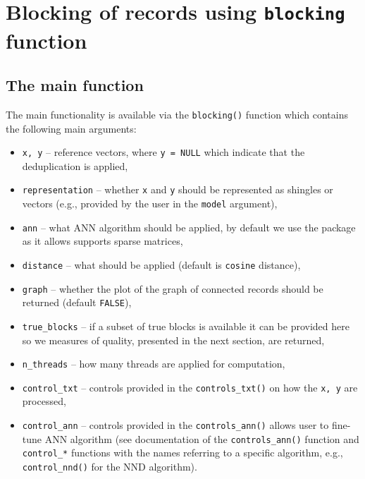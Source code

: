 \section{\texorpdfstring{Blocking of records using \texttt{blocking} function}{Blocking of records using blocking function}}\label{sec-blocks}

\subsection{The main function}\label{the-main-function}

The main functionality is available via the \texttt{blocking()} function which
contains the following main arguments:

\begin{itemize}
\tightlist
\item
  \texttt{x,\ y} -- reference vectors, where \texttt{y\ =\ NULL} which indicate that
  the deduplication is applied,
\item
  \texttt{representation} -- whether \texttt{x} and \texttt{y} should be represented as
  shingles or vectors (e.g., provided by the user in the \texttt{model}
  argument),
\item
  \texttt{ann} -- what ANN algorithm should be applied, by default we use the
   package as it allows supports sparse matrices,
\item
  \texttt{distance} -- what should be applied (default is \texttt{cosine} distance),
\item
  \texttt{graph} -- whether the plot of the graph of connected records should
  be returned (default \texttt{FALSE}),
\item
  \texttt{true\_blocks} -- if a subset of true blocks is available it can be
  provided here so we measures of quality, presented in the next
  section, are returned,
\item
  \texttt{n\_threads} -- how many threads are applied for computation,
\item
  \texttt{control\_txt} -- controls provided in the \texttt{controls\_txt()} on how
  the \texttt{x,\ y} are processed,
\item
  \texttt{control\_ann} -- controls provided in the \texttt{controls\_ann()} allows
  user to fine-tune ANN algorithm (see documentation of the
  \texttt{controls\_ann()} function and \texttt{control\_*} functions with the names
  referring to a specific algorithm, e.g., \texttt{control\_nnd()} for the NND
  algorithm).
\end{itemize}

